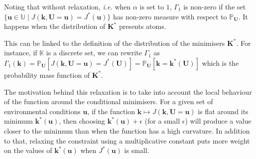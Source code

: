 \documentclass[preprint, review, 1p]{elsarticle}
\newcommand{\Prob}{\mathbb{P}}
\newcommand{\Kspace}{\mathbb{K}}
\newcommand{\Uspace}{\mathbb{U}}
\begin{document}
Noting that without relaxation, \textit{i.e.} when $\alpha$ is set to $1$, $\Gamma_1$ is non-zero if the set $\{\mathbf{u}\in\Uspace \mid J(\mathbf{k},\mathbf{U}=\mathbf{u}) = J^*(\mathbf{u})\}$ has non-zero measure with respect to $\Prob_{\mathbf{U}}$. It happens when the distribution of $\mathbf{K}^*$ presents atoms.

This can be linked to the definition of the distribution of the minimisers $\mathbf{K}^*$. For instance, if $\Kspace$ is a discrete set, we can rewrite $\Gamma_1$ as $\Gamma_1(\mathbf{k})=\Prob_{\mathbf{U}}\left[J(\mathbf{k},\mathbf{U}=\mathbf{u}) = J^*(\mathbf{U})\right] = \Prob_{\mathbf{U}}\left[\mathbf{k} = \mathbf{k}^*(\mathbf{U})\right]$ which is the probability mass function of $\mathbf{K}^*$.

The motivation behind this relaxation is to take into account the local behaviour of the function around the conditional minimisers.
For a given set of environmental conditions $\mathbf{u}$, if the function $\mathbf{k} \mapsto J(\mathbf{k},\mathbf{U}=\mathbf{u})$ is flat around its minimum $\mathbf{k}^*(\mathbf{u})$, then choosing  $\mathbf{k}^*(\mathbf{u}) + \epsilon$ (for a small $\epsilon$) will produce a value closer to the minimum than when the function has a high curvature.
In addition to that, relaxing the constraint using a multiplicative constant puts more weight on the values of $\mathbf{k}^*(\mathbf{u})$ when $J^*(\mathbf{u})$ is small.
\end{document}
